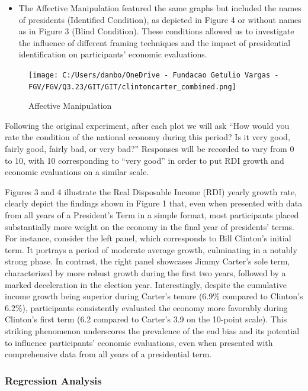 \documentclass[
]{article}
\providecommand{\tightlist}{%
  \setlength{\itemsep}{0pt}\setlength{\parskip}{0pt}}
\begin{document}
\begin{itemize}
\tightlist
\item
  The Affective Manipulation featured the same graphs but included the
  names of presidents (Identified Condition), as depicted in Figure 4 or
  without names as in Figure 3 (Blind Condition). These conditions
  allowed us to investigate the influence of different framing
  techniques and the impact of presidential identification on
  participants' economic evaluations.
\end{itemize}

\begin{figure}
\hypertarget{fig:label}{%
\centering
\texttt{[image: C:/Users/danbo/OneDrive - Fundacao Getulio Vargas - FGV/FGV/Q3.23/GIT/GIT/clintoncarter\_combined.png]}
\caption{Affective Manipulation}\label{fig:label}
}
\end{figure}

Following the original experiment, after each plot we will ask ``How
would you rate the condition of the national economy during this period?
Is it very good, fairly good, fairly bad, or very bad?'' Responses will
be recorded to vary from 0 to 10, with 10 corresponding to ``very good''
in order to put RDI growth and economic evaluations on a similar scale.

Figures 3 and 4 illustrate the Real Disposable Income (RDI) yearly
growth rate, clearly depict the findings shown in Figure 1 that, even
when presented with data from all years of a President's Term in a
simple format, most participants placed substantially more weight on the
economy in the final year of presidents' terms. For instance, consider
the left panel, which corresponds to Bill Clinton's initial term. It
portrays a period of moderate average growth, culminating in a notably
strong phase. In contrast, the right panel showcases Jimmy Carter's sole
term, characterized by more robust growth during the first two years,
followed by a marked deceleration in the election year. Interestingly,
despite the cumulative income growth being superior during Carter's
tenure (6.9\% compared to Clinton's 6.2\%), participants consistently
evaluated the economy more favorably during Clinton's first term (6.2
compared to Carter's 3.9 on the 10-point scale). This striking
phenomenon underscores the prevalence of the end bias and its potential
to influence participants' economic evaluations, even when presented
with comprehensive data from all years of a presidential term.

\hypertarget{regression-analysis}{%
\subsubsection{Regression Analysis}\label{regression-analysis}}
\end{document}
